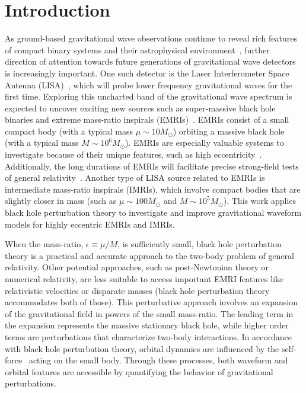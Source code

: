 \documentclass[aps,prd,twocolumn,showpacs,notitlepage,eqsecnum,
superscriptaddress,nofootinbib]{revtex4-1}
\begin{document}
\section{Introduction}

As ground-based gravitational wave observations continue to reveal rich features of compact binary systems and their astrophysical environment~\cite{Abbott_2019}, further direction of attention towards future generations of gravitational wave detectors is increasingly important. One such detector is the Laser Interferometer Space Antenna (LISA)~\cite{baker2019laser}, which will probe lower frequency gravitational waves for the first time. Exploring this uncharted band of the gravitational wave spectrum is expected to uncover exciting new sources such as super-massive black hole binaries and extreme mass-ratio inspirals (EMRIs)~\cite{Amaro_Seoane_2018}. EMRIs consist of a small compact body (with a typical mass $\mu\sim 10 M_\odot$) orbiting a massive black hole (with a typical mass $M\sim 10^6 M_\odot$). EMRIs are especially valuable systems to investigate because of their unique features, such as high eccentricity~\cite{HopmAlex05}. Additionally, the long durations of EMRIs will facilitate precise strong-field tests of general relativity~\cite{Barack_2007,berry2019unique}. Another type of LISA source related to EMRIs is intermediate mass-ratio inspirals (IMRIs), which involve compact bodies that are slightly closer in mass (such as $\mu\sim 100 M_\odot$ and $M\sim 10^5 M_\odot$). This work applies black hole perturbation theory to investigate and improve gravitational waveform models for highly eccentric EMRIs and IMRIs.

When the mass-ratio, $\epsilon \equiv \mu/M$, is sufficiently small, black hole perturbation theory is a practical and accurate approach to the two-body problem of general relativity. Other potential approaches, such as post-Newtonian theory or numerical relativity, are less suitable to access important EMRI features like relativistic velocities or disparate masses (black hole perturbation theory accommodates both of those). This perturbative approach involves an expansion of the gravitational field in powers of the small mass-ratio. The leading term in the expansion represents the massive stationary black hole, while higher order terms are perturbations that characterize two-body interactions. In accordance with black hole perturbation theory, orbital dynamics are influenced by the self-force~\cite{Mino_1997,Quinn_1997} acting on the small body. Through these processes, both waveform and orbital features are accessible by quantifying the behavior of gravitational perturbations.
\end{document}
